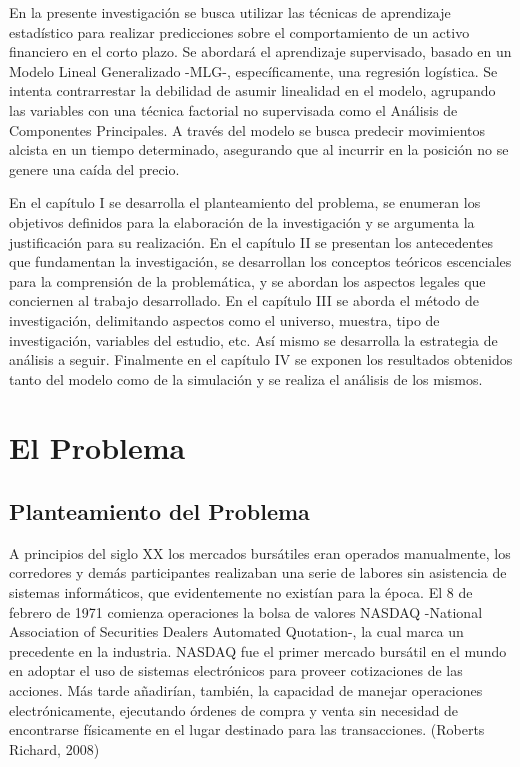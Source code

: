 \documentclass[a4paper,12pt]{Latex/Classes/PhDthesisPSnPDF}
\begin{document}
En la presente investigación se busca utilizar las técnicas de aprendizaje estadístico para realizar predicciones sobre el comportamiento de un activo financiero en el corto  plazo. Se abordará el aprendizaje supervisado, basado en un Modelo Lineal Generalizado -MLG-, específicamente, una regresión logística. Se intenta contrarrestar la debilidad de asumir linealidad en el modelo, agrupando las variables con una técnica factorial no supervisada como el Análisis de Componentes Principales. A través del modelo se busca predecir movimientos alcista en un tiempo determinado, asegurando que al incurrir en la posición no se genere una caída del precio.


En el capítulo I se desarrolla el planteamiento del problema, se enumeran los objetivos definidos para la elaboración de la investigación y se argumenta la justificación para su realización. En el capítulo II se presentan los antecedentes que fundamentan la investigación, se desarrollan los conceptos teóricos escenciales para la comprensión de la problemática, y se abordan los aspectos legales que conciernen al trabajo desarrollado. En el capítulo III se aborda el método de investigación, delimitando aspectos como el universo, muestra, tipo de investigación, variables del estudio, etc. Así mismo se desarrolla la estrategia de análisis a seguir. Finalmente en el capítulo IV se exponen los resultados obtenidos tanto del modelo como de la simulación y se realiza el análisis de los mismos.

\chapter{El Problema}

\section{Planteamiento del Problema}

A principios del siglo XX los mercados bursátiles eran operados manualmente, los corredores y demás participantes realizaban una serie de labores sin asistencia de sistemas informáticos, que evidentemente no existían para la época. El 8 de febrero de 1971 comienza operaciones la bolsa de valores NASDAQ -National Association of Securities Dealers Automated Quotation-, la cual marca un precedente en la industria. NASDAQ fue el primer mercado bursátil en el mundo en adoptar el uso de sistemas electrónicos para proveer cotizaciones de las acciones. Más tarde añadirían, también, la capacidad de manejar operaciones electrónicamente, ejecutando órdenes de compra y venta sin necesidad de encontrarse físicamente en el lugar destinado para las transacciones. (Roberts Richard, 2008)
\end{document}
